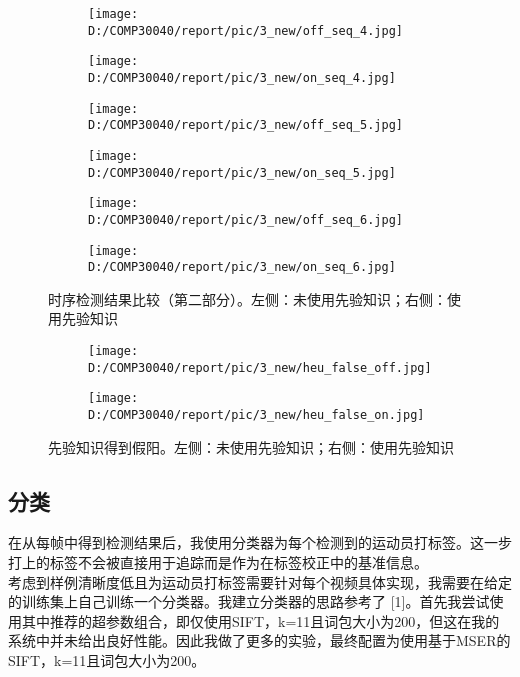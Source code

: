 \documentclass{article}
\begin{document}
\begin{figure}[h!]
  \begin{subfigure}[b]{0.5\linewidth}
  \centering
	\texttt{[image: D:/COMP30040/report/pic/3\_new/off\_seq\_4.jpg]} 
  \end{subfigure}
  \begin{subfigure}[b]{0.5\linewidth}
  \centering
	\texttt{[image: D:/COMP30040/report/pic/3\_new/on\_seq\_4.jpg]} 
  \end{subfigure}
    \begin{subfigure}[b]{0.5\linewidth}
  \centering
	\texttt{[image: D:/COMP30040/report/pic/3\_new/off\_seq\_5.jpg]} 
  \end{subfigure}
  \begin{subfigure}[b]{0.5\linewidth}
  \centering
	\texttt{[image: D:/COMP30040/report/pic/3\_new/on\_seq\_5.jpg]} 
  \end{subfigure}
    \begin{subfigure}[b]{0.5\linewidth}
  \centering
	\texttt{[image: D:/COMP30040/report/pic/3\_new/off\_seq\_6.jpg]} 
  \end{subfigure}
  \begin{subfigure}[b]{0.5\linewidth}
  \centering
	\texttt{[image: D:/COMP30040/report/pic/3\_new/on\_seq\_6.jpg]} 
  \end{subfigure}
  \caption{时序检测结果比较（第二部分）。左侧：未使用先验知识；右侧：使用先验知识}
\end{figure}

\begin{figure}[h!]
  \begin{subfigure}[b]{0.5\linewidth}
  \centering
	\texttt{[image: D:/COMP30040/report/pic/3\_new/heu\_false\_off.jpg]} 
  \end{subfigure}
  \begin{subfigure}[b]{0.5\linewidth}
  \centering
	\texttt{[image: D:/COMP30040/report/pic/3\_new/heu\_false\_on.jpg]} 
  \end{subfigure}
  \caption{先验知识得到假阳。左侧：未使用先验知识；右侧：使用先验知识}
\end{figure}

\subsection{分类}
在从每帧中得到检测结果后，我使用分类器为每个检测到的运动员打标签。这一步打上的标签不会被直接用于追踪而是作为在标签校正中的基准信息。\\
考虑到样例清晰度低且为运动员打标签需要针对每个视频具体实现，我需要在给定的训练集上自己训练一个分类器。我建立分类器的思路参考了 [1]。首先我尝试使用其中推荐的超参数组合，即仅使用SIFT，k=11且词包大小为200，但这在我的系统中并未给出良好性能。因此我做了更多的实验，最终配置为使用基于MSER的SIFT，k=11且词包大小为200。
\end{document}
